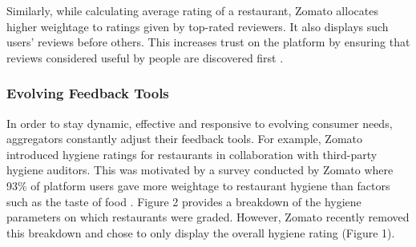 \documentclass[a4paper, 12pt, twoside]{article}
\begin{document}
Similarly, while calculating average rating of a restaurant, Zomato allocates higher weightage to ratings given by top-rated reviewers. It also displays such users’ reviews before others. This increases trust on the platform by ensuring that reviews considered useful by people are discovered first \parencite{GoyalD2012}. 
                    
                    \subsubsection{Evolving Feedback Tools}
                    
                   In order to stay dynamic, effective and responsive to evolving consumer needs, aggregators constantly adjust their feedback tools. For example, Zomato introduced hygiene ratings for restaurants in collaboration with third-party hygiene auditors. This was motivated by a survey conducted by Zomato where 93\% of platform users gave more weightage to restaurant hygiene than factors such as the taste of food \parencite{GoyalD2017}. Figure 2 provides a breakdown of the hygiene parameters on which restaurants were graded. However, Zomato recently removed this breakdown and chose to only display the overall hygiene rating (Figure 1). \\
                   
\end{document}
